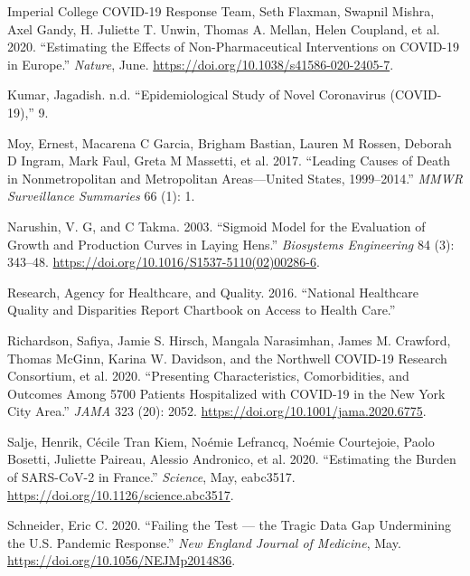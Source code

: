 \documentclass[
]{article}
\begin{document}
\leavevmode\hypertarget{ref-imperial_college_covid-19_response_team_estimating_2020}{}%
Imperial College COVID-19 Response Team, Seth Flaxman, Swapnil Mishra, Axel Gandy, H. Juliette T. Unwin, Thomas A. Mellan, Helen Coupland, et al. 2020. ``Estimating the Effects of Non-Pharmaceutical Interventions on COVID-19 in Europe.'' \emph{Nature}, June. \url{https://doi.org/10.1038/s41586-020-2405-7}.

\leavevmode\hypertarget{ref-kumar_epidemiological_nodate}{}%
Kumar, Jagadish. n.d. ``Epidemiological Study of Novel Coronavirus (COVID-19),'' 9.

\leavevmode\hypertarget{ref-moy_leading_2017}{}%
Moy, Ernest, Macarena C Garcia, Brigham Bastian, Lauren M Rossen, Deborah D Ingram, Mark Faul, Greta M Massetti, et al. 2017. ``Leading Causes of Death in Nonmetropolitan and Metropolitan Areas---United States, 1999--2014.'' \emph{MMWR Surveillance Summaries} 66 (1): 1.

\leavevmode\hypertarget{ref-narushin_sigmoid_2003}{}%
Narushin, V. G, and C Takma. 2003. ``Sigmoid Model for the Evaluation of Growth and Production Curves in Laying Hens.'' \emph{Biosystems Engineering} 84 (3): 343--48. \url{https://doi.org/10.1016/S1537-5110(02)00286-6}.

\leavevmode\hypertarget{ref-research_national_2016}{}%
Research, Agency for Healthcare, and Quality. 2016. ``National Healthcare Quality and Disparities Report Chartbook on Access to Health Care.''

\leavevmode\hypertarget{ref-richardson_presenting_2020}{}%
Richardson, Safiya, Jamie S. Hirsch, Mangala Narasimhan, James M. Crawford, Thomas McGinn, Karina W. Davidson, and the Northwell COVID-19 Research Consortium, et al. 2020. ``Presenting Characteristics, Comorbidities, and Outcomes Among 5700 Patients Hospitalized with COVID-19 in the New York City Area.'' \emph{JAMA} 323 (20): 2052. \url{https://doi.org/10.1001/jama.2020.6775}.

\leavevmode\hypertarget{ref-salje_estimating_2020}{}%
Salje, Henrik, Cécile Tran Kiem, Noémie Lefrancq, Noémie Courtejoie, Paolo Bosetti, Juliette Paireau, Alessio Andronico, et al. 2020. ``Estimating the Burden of SARS-CoV-2 in France.'' \emph{Science}, May, eabc3517. \url{https://doi.org/10.1126/science.abc3517}.

\leavevmode\hypertarget{ref-schneider_failing_2020}{}%
Schneider, Eric C. 2020. ``Failing the Test --- the Tragic Data Gap Undermining the U.S. Pandemic Response.'' \emph{New England Journal of Medicine}, May. \url{https://doi.org/10.1056/NEJMp2014836}.
\end{document}

